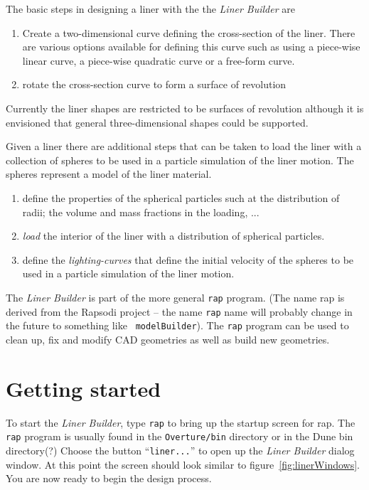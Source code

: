 \documentclass[12pt]{article}
\newcommand{\cmd}[1]{``{\tt #1}''}
\begin{document}
The basic steps in designing a liner with the the {\em Liner Builder} are
\begin{enumerate}
  \item Create a two-dimensional curve defining the cross-section of the liner. There are various options 
    available for defining this curve such as using a piece-wise linear curve, a piece-wise
    quadratic curve or a free-form curve.
  \item rotate the cross-section curve to form a surface of revolution
\end{enumerate}
Currently the liner shapes are restricted to be surfaces of revolution although it is envisioned
that general three-dimensional shapes could be supported.

Given a liner there are additional steps that can be taken 
to load the liner with a collection of spheres to be used in a particle simulation of the liner motion.
The spheres represent a model of the liner material. 
\begin{enumerate}
  \item define the properties of the spherical particles such at the distribution of radii; the volume and
    mass fractions in the loading, ...
  \item {\em load} the interior of the liner with a distribution of spherical particles.
  \item define the {\em lighting-curves} that define the initial velocity of the spheres to be used in
     a particle simulation of the liner motion.
\end{enumerate}

The {\em Liner Builder} is part of the more general {\tt rap}
program.  (The name rap is derived from the Rapsodi project -- the name {\tt rap}
name will probably change in the future to something like {\tt
modelBuilder}).  The {\tt rap} program can be used to clean up, fix and
modify CAD geometries as well as build new geometries. 





\section{Getting started}

To start the {\em Liner Builder}, type {\tt rap} to bring up the startup screen for rap. 
The {\tt rap} program is usually found in the
{\tt Overture/bin} directory or in the Dune bin directory(?)
Choose the button \cmd{liner...} to open up the {\em Liner Builder} dialog window.
At this point the screen should look similar to figure~\ref{fig:linerWindows}.
You are now ready to begin the design process.
\end{document}
